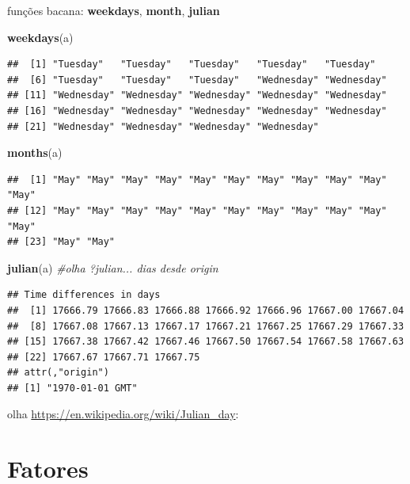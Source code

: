 \documentclass[]{book}
\newenvironment{Shaded}{\begin{snugshade}}{\end{snugshade}}
\newcommand{\KeywordTok}[1]{\textcolor[rgb]{0.13,0.29,0.53}{\textbf{#1}}}
\newcommand{\CommentTok}[1]{\textcolor[rgb]{0.56,0.35,0.01}{\textit{#1}}}
\newcommand{\NormalTok}[1]{#1}
\begin{document}
funções bacana: \textbf{weekdays}, \textbf{month}, \textbf{julian}

\begin{Shaded}
\begin{Highlighting}[]
\KeywordTok{weekdays}\NormalTok{(a)}
\end{Highlighting}
\end{Shaded}

\begin{verbatim}
##  [1] "Tuesday"   "Tuesday"   "Tuesday"   "Tuesday"   "Tuesday"  
##  [6] "Tuesday"   "Tuesday"   "Tuesday"   "Wednesday" "Wednesday"
## [11] "Wednesday" "Wednesday" "Wednesday" "Wednesday" "Wednesday"
## [16] "Wednesday" "Wednesday" "Wednesday" "Wednesday" "Wednesday"
## [21] "Wednesday" "Wednesday" "Wednesday" "Wednesday"
\end{verbatim}

\begin{Shaded}
\begin{Highlighting}[]
\KeywordTok{months}\NormalTok{(a)}
\end{Highlighting}
\end{Shaded}

\begin{verbatim}
##  [1] "May" "May" "May" "May" "May" "May" "May" "May" "May" "May" "May"
## [12] "May" "May" "May" "May" "May" "May" "May" "May" "May" "May" "May"
## [23] "May" "May"
\end{verbatim}

\begin{Shaded}
\begin{Highlighting}[]
\KeywordTok{julian}\NormalTok{(a) }\CommentTok{#olha ?julian... dias desde origin}
\end{Highlighting}
\end{Shaded}

\begin{verbatim}
## Time differences in days
##  [1] 17666.79 17666.83 17666.88 17666.92 17666.96 17667.00 17667.04
##  [8] 17667.08 17667.13 17667.17 17667.21 17667.25 17667.29 17667.33
## [15] 17667.38 17667.42 17667.46 17667.50 17667.54 17667.58 17667.63
## [22] 17667.67 17667.71 17667.75
## attr(,"origin")
## [1] "1970-01-01 GMT"
\end{verbatim}

olha \url{https://en.wikipedia.org/wiki/Julian_day}:

\section{Fatores}\label{fatores}
\end{document}
